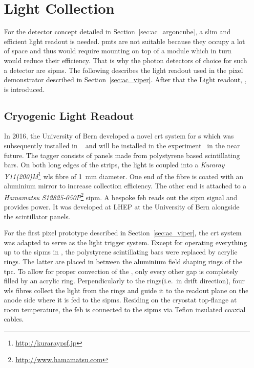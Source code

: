 \section{Light Collection}
\label{sec:studies_light-col}

For the \AC{} detector concept detailed in Section~\ref{sec:ac_argoncube}, a slim and efficient light readout is needed.
\glspl{pmt} are not suitable because they occupy a lot of space and thus would require mounting on top of a module which in turn would reduce their efficiency.
That is why the photon detectors of choice for such a detector are \glspl{sipm}.
The following describes the light readout used in the \AC{} pixel demonstrator described in Section~\ref{sec:ac_viper}.
After that the \AC{} Light readout, \AL{}, is introduced.


\subsection{Cryogenic  Light Readout}
\label{sec:studies_light-col_viper}

In 2016, the University of Bern developed a novel \gls{crt} system for \lartpc{}s which was subsequently installed in \uboone{}~\cite{uboone} and will be installed in the \sbnd{} experiment~\cite{sbnd} in the near future.
The tagger consists of panels made from polystyrene based scintillating bars.
On both long edges of the strips, the light is coupled into a \emph{Kuraray Y11(200)M}\footnote{\url{http://kuraraypsf.jp}} \gls{wls} fibre of \SI{1}{\milli\metre} diameter.
One end of the fibre is coated with an aluminium mirror to increase collection efficiency.
The other end is attached to a \emph{Hamamatsu S12825-050P}\footnote{\url{http://www.hamamatsu.com}} \gls{sipm}.
A bespoke \gls{feb} reads out the \gls{sipm} signal and provides power.
It was developed at LHEP at the University of Bern alongside the scintillator panels\cite{crt_feb}.

For the first pixel prototype described in Section~\ref{sec:ac_viper}, the \gls{crt} system was adapted to serve as the light trigger system.
Except for operating everything up to the \glspl{sipm} in \lar{}, the polystyrene scintillating bars were replaced by acrylic rings.
The latter are placed in between the aluminium field shaping rings of the \gls{tpc}.
To allow for proper convection of the \lar{}, only every other gap is completely filled by an acrylic ring.
Perpendicularly to the rings(i.e.\ in drift direction), four \gls{wls} fibres collect the light from the rings and guide it to the readout plane on the anode side where it is fed to the \glspl{sipm}.
Residing on the cryostat top-flange at room temperature, the \gls{feb} is connected to the \glspl{sipm} via Teflon insulated coaxial cables.

